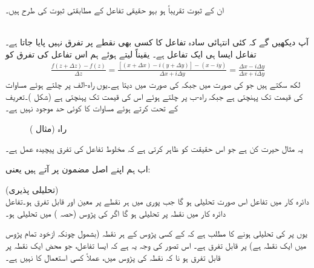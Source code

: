 ان کے ثبوت تقریباً ہو بہو حقیقی تفاعل کے مطابقتی ثبوت کی طرح ہیں۔

\quad {}\\
آپ دیکھیں گے کہ کئی انتہائی سادہ تفاعل کا کسی بھی نقطے پر تفرق نہیں پایا جاتا ہے۔تفاعل  ایسا ہی ایک تفاعل ہے۔ یقیناً  لیتے ہوئے ہم اس تفاعل کی تفرق کو
\begin{align}\label{مساوات_مخلوط_نا_قابل_تفرق}
\frac{f(z+\Delta z)-f(z)}{\Delta z}=\frac{[(x+\Delta x)-i(y+\Delta y)]-(x-iy)}{\Delta x+i\Delta y}=\frac{\Delta x-i\Delta y}{\Delta x+i\Delta y}
\end{align}
لکھ سکتے ہیں جو  کی صورت میں  جبکہ  کی صورت میں  دیتا ہے۔یوں  راہ-الف پر چلتے ہوئے مساوات  کی قیمت  تک پہنچتی ہے جبکہ راہ-ب پر چلتے ہوئے اس کی قیمت  تک پہنچتی ہے (شکل )۔تعریف کے تحت  کرتے ہوئے  مساوات  کا کوئی حد موجود نہیں ہے۔
\begin{figure}
\centering
{}
\caption{راہ (مثال )}
\label{شکل_مثال_مخلوط_نا_قابل_تفرق}
\end{figure}
یہ مثال حیرت کن ہے جو اس حقیقت کو ظاہر کرتی ہے کہ مخلوط تفاعل کی تفرق پیچیدہ عمل ہے۔

اب ہم اپنے اصل مضمون پر آتے ہیں یعنی:

\quad (تحلیلی پذیری)\\
دائرہ کار  میں تفاعل  اس صورت تحلیلی ہو گا جب پوری  میں ہر نقطے پر  معین اور قابل تفرق ہو۔تفاعل  دائرہ کار  میں نقطہ  پر تحلیلی ہو گا اگر  کی پڑوس (حصہ ) میں  تحلیلی ہو۔

یوں  پر  کی تحلیلی ہونے کا مطلب ہے کہ  کے کسی پڑوس کے ہر نقطہ (بشمول  چونکہ  ازخود تمام پڑوس میں ایک نقطہ ہے) پر  قابل تفرق ہے۔ اس تصور کی وجہ یہ ہے کہ ایسا تفاعل، جو محض  ایک نقطہ پر قابل تفرق ہو نا کہ نقطہ کی پڑوس میں، عملاً  کسی استعمال کا نہیں ہے۔
 
